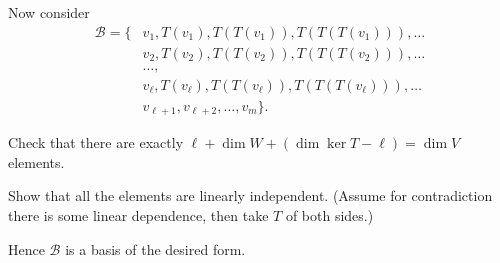 Now consider
\begin{align*}
	\mathcal B =
	\Big\{ & v_1, T(v_1), T(T(v_1)), T(T(T(v_1))), \dots \\
	& v_2, T(v_2), T(T(v_2)), T(T(T(v_2))), \dots \\
	& \dots, \\
	& v_\ell, T(v_\ell), T(T(v_\ell)), T(T(T(v_\ell))), \dots \\
	& v_{\ell+1}, v_{\ell+2}, \dots, v_m \Big\}.
\end{align*}
\begin{ques}
Check that there are exactly $\ell + \dim W + (\dim \ker T - \ell) = \dim V$ elements.
\end{ques}
\begin{exercise}
	Show that all the elements are linearly independent.
	(Assume for contradiction there is some linear dependence,
	then take $T$ of both sides.)
\end{exercise}
Hence $\mathcal B$ is a basis of the desired form.


